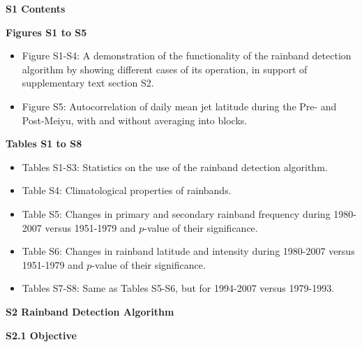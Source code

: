 \documentclass[final,grl]{agutexSI}
\begin{document}
\begin{article}

%
%


\noindent\textbf{{\Large S1 Contents}}

\vspace{2mm}

\noindent\textbf{Figures S1 to S5}
\begin{itemize}
	\item Figure S1-S4: A demonstration of the functionality of the rainband detection algorithm by showing different cases of its operation, in support of supplementary text section S2.

	\item Figure S5: Autocorrelation of daily mean jet latitude during the Pre- and Post-Meiyu, with and without averaging into blocks.

\end{itemize}

\vspace{3mm}

\noindent\textbf{Tables S1 to S8}
\begin{itemize}
\item Tables S1-S3: Statistics on the use of the rainband detection algorithm.

\item Table S4: Climatological properties of rainbands. 

\item Table S5: Changes in primary and secondary rainband frequency during 1980-2007 versus 1951-1979 and $p$-value of their significance.

\item Table S6: Changes in rainband latitude and intensity during 1980-2007 versus 1951-1979 and $p$-value of their significance.

\item Tables S7-S8: Same as Tables S5-S6, but for 1994-2007 versus 1979-1993.
\end{itemize}

\vspace{5mm}

\noindent\textbf{{\Large S2 Rainband Detection Algorithm}}
\vspace{2mm}

\noindent\textbf{S2.1 Objective}


\end{article}
\end{document}
